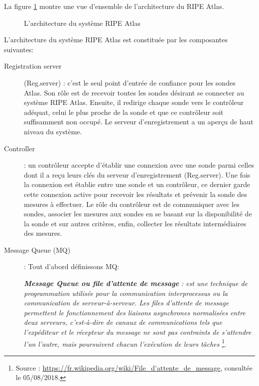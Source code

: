La figure  \ref{fig:archi-ripe-atlas} montre une vue d'ensemble de l'architecture du RIPE Atlas.

\begin{figure}[H]
	\centering
	\resizebox{\textwidth}{!}{
		 
	}
	\caption{L'architecture du système  RIPE Atlas  }
	\label{fig:archi-ripe-atlas}
\end{figure}

L'architecture du système  RIPE Atlas est constituée par  les composantes suivantes:
\begin{description}
	\item [Registration server] (Reg.server) : c'est le seul point d'entrée de confiance pour les sondes Atlas. Son rôle est de recevoir toutes les sondes désirant se connecter au système RIPE Atlas. Ensuite, il redirige chaque sonde vers le contrôleur adéquat, celui le plus proche de la sonde et que ce contrôleur  soit suffisamment non occupé.  Le serveur d'enregistrement  a un aperçu de haut niveau du système.
	
	\item [Controller]: un contrôleur accepte d'établir une connexion avec une sonde parmi celles dont il a reçu leurs clés du serveur d'enregistrement (Reg.server). Une fois la connexion est établie entre une sonde et un contrôleur, ce dernier garde cette connexion active pour recevoir les résultats et prévenir la sonde des mesures à effectuer.  Le rôle du contrôleur est de communiquer avec les sondes,  associer les mesures aux sondes en se basant sur la disponibilité de la sonde et sur autres critères, enfin, collecter les résultats intermédiaires des mesures.
	
	\item [Message Queue (MQ)] : Tout d'abord définissons MQ:
	
	\begin{tcolorbox}[title=Message Queue]
		\og    \textbf{\textit{Message Queue ou file d'attente de message}} \textit{:  est une technique de programmation utilisée pour la communication interprocessus ou la communication de serveur-à-serveur. Les files d'attente de message permettent le fonctionnement des liaisons asynchrones normalisées entre deux serveurs, c'est-à-dire de canaux de communications tels que l'expéditeur et le récepteur du message ne sont pas contraints de s'attendre l'un l'autre, mais poursuivent chacun l'exécution de leurs tâches} \footnote{Source : \url{https://fr.wikipedia.org/wiki/File\_d'attente\_de\_message}, consultée le $05/08/2018$.}. \fg{}
	\end{tcolorbox} 
	

\end{description}
